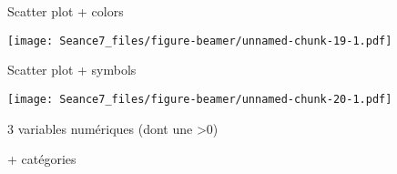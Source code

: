 \documentclass[ignorenonframetext,]{beamer}
\newenvironment{Shaded}{\begin{snugshade}}{\end{snugshade}}
\newcommand{\DataTypeTok}[1]{\textcolor[rgb]{0.13,0.29,0.53}{#1}}
\newcommand{\KeywordTok}[1]{\textcolor[rgb]{0.13,0.29,0.53}{\textbf{#1}}}
\newcommand{\NormalTok}[1]{#1}
\newcommand{\OperatorTok}[1]{\textcolor[rgb]{0.81,0.36,0.00}{\textbf{#1}}}
\newcommand{\StringTok}[1]{\textcolor[rgb]{0.31,0.60,0.02}{#1}}
\begin{document}
\begin{frame}[fragile]{Scatter plot + colors}
\protect\hypertarget{scatter-plot-colors}{}

\begin{Shaded}
\end{Shaded}

\texttt{[image: Seance7\_files/figure-beamer/unnamed-chunk-19-1.pdf]}

\end{frame}

\begin{frame}[fragile]{Scatter plot + symbols}
\protect\hypertarget{scatter-plot-symbols}{}

\begin{Shaded}
\end{Shaded}

\texttt{[image: Seance7\_files/figure-beamer/unnamed-chunk-20-1.pdf]}

\end{frame}

\begin{frame}{}
\protect\hypertarget{section-12}{}

{ 3 variables numériques (dont une \textgreater{}0)}

{ + catégories}

\end{frame}
\end{document}

